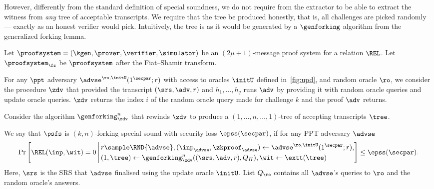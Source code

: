 However, differently from the standard definition of special soundness, we do
not require from the extractor to be able to extract the witness from \emph{any}
tree of acceptable transcripts. We require that the tree be produced honestly,
that is, all challenges are picked randomly --- exactly as an honest verifier would pick.
Intuitively, the tree is as it would be generated by a $\genforking$
algorithm from the generalized forking lemma.


\begin{definition}
	Let $\proofsystem = (\kgen, \prover, \verifier, \simulator)$ be an
  $(2 \mu + 1)$-message proof system for a relation $\REL$.  Let $\proofsystem_\fs$
  be $\proofsystem$ after the Fiat--Shamir transform.
	
	For any $\ppt$ adversary $\advse^{\ro, \initU} (1^\secpar; r)$ with access to
  oracles $\initU$ defined in~\cref{fig:upd}, and random oracle $\ro$, we consider
  the procedure $\zdv$ that provided the transcript $(\srs, \adv, r)$ and
  $h_1, \ldots, h_q$ runs $\adv$ by providing it with random oracle queries and
  update oracle queries.
	$\zdv$ returns the index $i$ of the
	random oracle query made for challenge $k$ and the proof $\adv$ returns.
	
	Consider the algorithm $\genforking_{\zdv}^{n}$
	that rewinds $\zdv$ to produce a $(1,\dots, n, \dots, 1)$-tree of
	accepting transcripts $\tree$.
	
	We say that $\psfs$ is $(k,n)$-forking special sound with security loss $\epss(\secpar)$, if
	for any PPT adversary $\advse$
	\begin{align*}
	\Pr\left[
	\REL(\inp, \wit) = 0
	\,\Biggl|\,
	\begin{aligned}
	& r \sample \RND{\advse},
	(\inp_{\advse}, \zkproof_{\advse}) \gets \advse^{\ro, \initU} (1^\secpar; r), \\
	&    (1, \tree) \gets \genforking_{\zdv}^{n}((\srs,\adv,r),Q_{H}),
	\wit \gets \extt(\tree)
	\end{aligned}
	\right] \leq \epss(\secpar).
	\end{align*}
	Here, $\srs$ is the SRS that $\advse$ finalised using the update oracle $\initU$.
	List $Q_\ro$ contains all $\advse$'s
	queries to $\ro$ and the random oracle's answers.
\end{definition}

